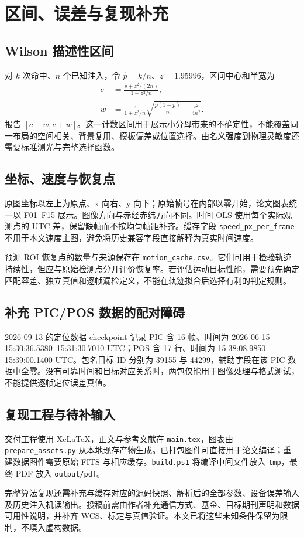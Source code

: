 \documentclass[UTF8,a4paper,11pt,fontset=windows]{ctexart}
\begin{document}
\section{区间、误差与复现补充}
\subsection{Wilson 描述性区间}
对 $k$ 次命中、$n$ 个已知注入，令 $\widehat p=k/n$、$z=1.95996$，区间中心和半宽为
\begin{align}
 c&=\frac{\widehat p+z^2/(2n)}{1+z^2/n},\\
 w&=\frac{z}{1+z^2/n}\sqrt{\frac{\widehat p(1-\widehat p)}{n}+\frac{z^2}{4n^2}}.
\end{align}
报告 $[c-w,c+w]$。这一计数区间用于展示小分母带来的不确定性，不能覆盖同一布局的空间相关、背景复用、模板偏差或位置选择。由名义强度到物理灵敏度还需要标准测光与完整选择函数。

\subsection{坐标、速度与恢复点}
原图坐标以左上为原点、x 向右、y 向下；原始帧号在内部以零开始，论文图表统一以 F01--F15 展示。图像方向与赤经赤纬方向不同。时间 OLS 使用每个实际观测点的 UTC 差，保留缺帧而不按均匀帧距补齐。缓存字段 \texttt{speed\_px\_per\_frame} 不用于本文速度主图，避免将历史兼容字段直接解释为真实时间速度。

预测 ROI 恢复点的数量与来源保存在 \texttt{motion\_cache.csv}。它们可用于检验轨迹持续性，但应与原始检测点分开评价恢复率。若评估运动目标性能，需要预先确定匹配容差、独立真值和逐帧漏检定义，不能在轨迹拟合后选择有利的判定规则。

\subsection{补充 PIC/POS 数据的配对障碍}
2026-09-13 的定位数据 checkpoint 记录 PIC 含 16 帧、时间为 2026-06-15 15:30:36.5380--15:31:30.7010 UTC；POS 含 17 行、时间为 15:38:08.9850--15:39:00.1400 UTC。包名目标 ID 分别为 39155 与 44299，辅助字段在该 PIC 数据中全零。没有可靠时间和目标对应关系时，两包仅能用于图像处理与格式测试，不能提供逐帧定位误差真值。

\subsection{复现工程与待补输入}
交付工程使用 XeLaTeX，正文与参考文献在 \texttt{main.tex}，图表由 \texttt{prepare\_assets.py} 从本地现存产物生成。已打包图件可直接用于论文编译；重建数据图件需要原始 FITS 与相应缓存。\texttt{build.ps1} 将编译中间文件放入 \texttt{tmp}，最终 PDF 放入 \texttt{output/pdf}。

完整算法复现还需补充与缓存对应的源码快照、解析后的全部参数、设备误差输入及历史注入机读输出。投稿前需由作者补充通信方式、基金、目标期刊声明和数据可用性说明，并补齐 WCS、标定与真值验证。本文已将这些未知条件保留为限制，不填入虚构数据。
\end{document}
